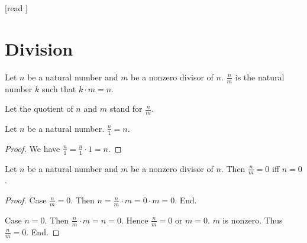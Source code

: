 \documentclass[10pt]{article}
\begin{document}
  \begin{imports}
    \begin{forthel}
      [read ]
    \end{forthel}
  \end{imports}


  \section*{Division}

  \begin{forthel}
    \begin{definition}[id=ARITHMETIC_14_2313654268297915,printid]
      Let $n$ be a natural number and $m$ be a nonzero divisor of $n$.
      $\frac{n}{m}$ is the natural number $k$ such that $k \cdot m = n$.
    \end{definition}

    Let the quotient of $n$ and $m$ stand for $\frac{n}{m}$.
  \end{forthel}

  \begin{forthel}
    \begin{proposition}[id=ARITHMETIC_14_0843793254698710,printid]
      Let $n$ be a natural number.
      $\frac{n}{1} = n$.
    \end{proposition}
    \begin{proof}
      We have $\frac{n}{1}
        = \frac{n}{1} \cdot 1
        = n$.
    \end{proof}
  \end{forthel}

  \begin{forthel}
    \begin{proposition}[id=ARITHMETIC_14_1254235698632545,printid]
      Let $n$ be a natural number and $m$ be a nonzero divisor of $n$.
      Then $\frac{n}{m} = 0$ iff $n = 0$.
    \end{proposition}
    \begin{proof}
      Case $\frac{n}{m} = 0$.
        Then $n
          = \frac{n}{m} \cdot m
          = 0 \cdot m
          = 0$.
      End.

      Case $n = 0$.
        Then $\frac{n}{m} \cdot m
          = n
          = 0$.
        Hence $\frac{n}{m} = 0$ or $m = 0$.
        $m$ is nonzero.
        Thus $\frac{n}{m} = 0$.
      End.
    \end{proof}
  \end{forthel}
\end{document}
